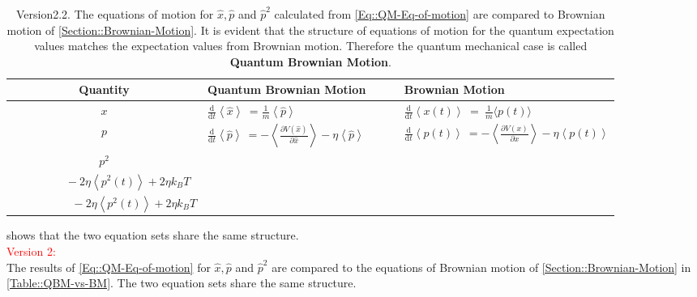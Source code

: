	\begin{table}[h]
		\centering
		\caption{Version2.2. The equations of motion for  $\hat{x}, \hat{p}$ and $\hat{p}^2$ calculated from  \autoref{Eq::QM-Eq-of-motion} are compared to Brownian motion of \autoref{Section::Brownian-Motion}. It is evident that the structure of equations of motion for the quantum expectation values matches the expectation values from Brownian motion. Therefore the quantum mechanical case is called \textbf{Quantum Brownian Motion}.}
		\renewcommand{\arraystretch}{1.7}
		\begin{tabular}{c l l}
			\toprule
			 Quantity & Quantum Brownian Motion $\qquad$  & Brownian Motion \\
			\midrule
			$x$ & $\frac{\text{d}}{\text{d}t} \left \langle \hat{x} \right \rangle \hspace{3pt}=	\frac{1}{m} \left\langle \hat{p} \right \rangle$ & $\frac{\text{d}}{\text{d}t} \left \langle {x}(t) \right \rangle \hspace{3pt}  =	~\frac{1}{m} \langle {p}(t) \rangle $ \\
			$p$ & $\frac{\text{d}}{\text{d}t} \left \langle \hat{p} \right \rangle ~= - 	\left\langle  \frac{\partial V(\hat{x})}{\partial \hat{x}} \right \rangle - \eta \left \langle \hat{p} \right \rangle$ &	$\frac{\text{d}}{\text{d}t} \left \langle {p}(t) \right \rangle ~=	- 	\left \langle \frac{\partial V({x})}{\partial {x}} \right \rangle - \eta \left \langle {p}(t) \right \rangle$ \\
			$p^2$ & \makecell[l]{$\frac{\text{d}}{\text{d}t} \left \langle \hat{p}^2 \right \rangle =	- \left\langle \hat{p} \frac{\partial V(\hat{x})}{\partial \hat{x}} + \frac{\partial V(\hat{x})}{\partial \hat{x}} \hat{p} \right \rangle$ \\ $ \qquad \qquad \hspace{2pt} - 2 \eta \left \langle {p}^2(t) \right \rangle + 2 \eta k_B T$} & \makecell[l]{$\frac{\text{d}}{\text{d}t} \left \langle {p}^2(t) \right \rangle = - \left\langle 2 {p}(t) \frac{\partial V({x})}{\partial {x}}\right \rangle $ \\ $ \qquad \qquad \hspace{3pt} \quad - 2 \eta \left \langle {p}^2(t) \right \rangle + 2 \eta k_B T$}\\
			\bottomrule
		\end{tabular}
		\label{Table::QBM-vs-BM}
	\end{table} \renewcommand{\arraystretch}{1.2}
	shows that the two equation sets share the same structure.\\
	\textcolor{red}{Version 2:}\\
	The results of \autoref{Eq::QM-Eq-of-motion} for $\hat{x}, \hat{p}$ and $\hat{p}^2$ are compared to the equations of Brownian motion of \autoref{Section::Brownian-Motion} in \autoref{Table::QBM-vs-BM}. The two equation sets share the same structure. \\
	
